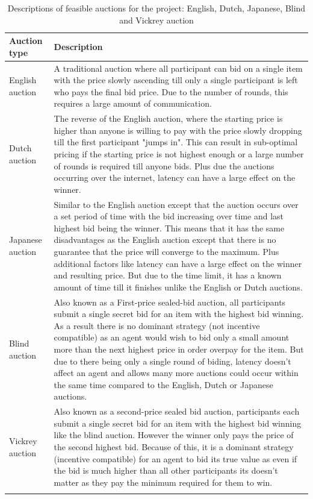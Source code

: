\begin{longtable}{|p{3.5cm}|p{11cm}|} \hline
    \textbf{Auction type} & \textbf{Description} \\ \hline
    English auction & A traditional auction where all participant can bid on a single item with the price slowly
        ascending till only a single participant is left who pays the final bid price. Due to the number of rounds,
        this requires a large amount of communication. \\ \hline

    Dutch auction & The reverse of the English auction, where the starting price is higher than anyone is willing to
        pay with the price slowly dropping till the first participant "jumps in". This can result in sub-optimal pricing
        if the starting price is not highest enough or a large number of rounds is required till anyone bids. Plus due
        the auctions occurring over the internet, latency can have a large effect on the winner. \\ \hline

    Japanese auction & Similar to the English auction except that the auction occurs over a set period of time with the
        bid increasing over time and last highest bid being the winner. This means that it has the same disadvantages
        as the English auction except that there is no guarantee that the price will converge to the maximum. Plus
        additional factors like latency can have a large effect on the winner and resulting price. But due to the time
        limit, it has a known amount of time till it finishes unlike the English or Dutch auctions. \\ \hline

    Blind auction & Also known as a First-price sealed-bid auction, all participants submit a single secret bid for an
        item with the highest bid winning. As a result there is no dominant strategy (not incentive compatible) as an
        agent would wish to bid only a small amount more than the next highest price in order overpay for the item.
        But due to there being only a single round of biding, latency doesn't affect an agent and allows many
        more auctions could occur within the same time compared to the English, Dutch or Japanese auctions. \\ \hline

    Vickrey auction~\citep{vickrey} & Also known as a second-price sealed bid auction, participants each submit
        a single secret bid for an item with the highest bid winning like the blind auction. However the winner only
        pays the price of the second highest bid. Because of this, it is a dominant strategy (incentive compatible)
        for an agent to bid its true value as even if the bid is much higher than all other participants its doesn't
        matter as they pay the minimum required for them to win. \\ \hline
    \caption{Descriptions of feasible auctions for the project: English, Dutch, Japanese, Blind and Vickrey auction}
    \label{tab:auctions_descriptions}
\end{longtable}

